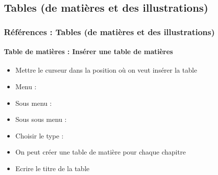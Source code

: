 \documentclass[xcolor=table]{beamer}
\begin{document}
\subsection{Tables (de matières et des illustrations)}

\begin{frame}
\frametitle{Références : Tables (de matières et des illustrations)}
\framesubtitle{Table de matières : Insérer une table de matières}

\begin{itemize}
	\item Mettre le curseur dans la position où on veut insérer la table
	\item Menu : 
	\item Sous menu : 
\end{itemize}
\begin{minipage}{0.39\textwidth}
	\begin{itemize}
		\item Sous sous menu : 
		\item Choisir le type : 
		\item On peut créer une table de matière pour chaque chapitre
		\item Ecrire le titre de la table
	\end{itemize}
\end{minipage}
\begin{minipage}{0.60\textwidth}
\end{minipage}

\end{frame}
\end{document}
